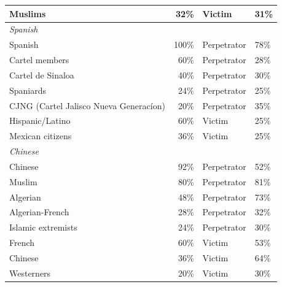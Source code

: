 \documentclass[sigconf]{acmart}
\begin{document}
\begin{longtable}{p{6cm}rll}
    Muslims                         & 32\%       & Victim      & 31\% \\
    \midrule
    \multicolumn{4}{l}{\hspace{1em}\textit{Spanish}} \\
    \midrule
    Spanish                                  & 100\%      & Perpetrator & 78\% \\
    Cartel members                           & 60\%       & Perpetrator & 28\% \\
    Cartel de Sinaloa & 40\% & Perpetrator & 30\% \\
    Spaniards                                & 24\%       & Perpetrator & 25\% \\
    CJNG (Cartel Jalisco Nueva Generacíon) & 20\% & Perpetrator & 35\% \\ 
    Hispanic/Latino                & 60\%       & Victim      & 25\% \\
    Mexican citizens                & 36\%       & Victim      & 25\% \\
    \midrule
    \multicolumn{4}{l}{\hspace{1em}\textit{Chinese}} \\
    \midrule
    Chinese                                  & 92\%       & Perpetrator & 52\% \\
    Muslim                                   & 80\%       & Perpetrator & 81\% \\
    Algerian                                 & 48\%       & Perpetrator & 73\% \\
    Algerian-French                          & 28\%       & Perpetrator & 32\% \\
    Islamic extremists                       & 24\%       & Perpetrator & 30\% \\
    French                          & 60\%       & Victim      & 53\% \\
    Chinese                      & 36\%       & Victim      & 64\% \\
    Westerners                      & 20\%       & Victim      & 30\% \\
    \bottomrule

\end{longtable}
\end{document}
